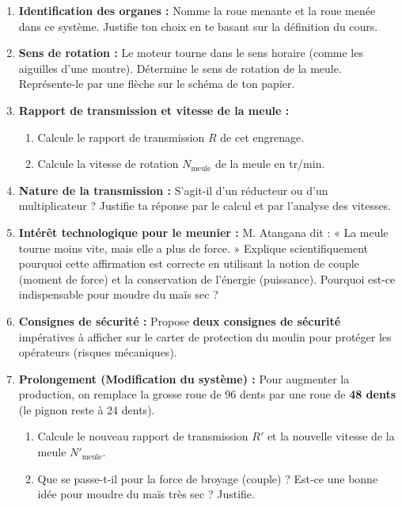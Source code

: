 \documentclass[11pt]{article}
\newcommand{\cle}[1]{{\popxbold\color{popdark}#1}}
\begin{document}
\begin{enumerate}
    \item \textbf{Identification des organes :} Nomme la \cle{roue menante} et la \cle{roue menée} dans ce système. Justifie ton choix en te basant sur la définition du cours.
    \item \textbf{Sens de rotation :} Le moteur tourne dans le sens horaire (comme les aiguilles d'une montre). Détermine le sens de rotation de la meule. Représente-le par une flèche sur le schéma de ton papier.
    \item \textbf{Rapport de transmission et vitesse de la meule :}
    \begin{enumerate}
        \item Calcule le \cle{rapport de transmission} $R$ de cet engrenage.
        \item Calcule la vitesse de rotation $N_{\text{meule}}$ de la meule en tr/min.
    \end{enumerate}
    \item \textbf{Nature de la transmission :} S'agit-il d'un \cle{réducteur} ou d'un \cle{multiplicateur} ? Justifie ta réponse par le calcul et par l'analyse des vitesses.
    \item \textbf{Intérêt technologique pour le meunier :} M. Atangana dit : « La meule tourne moins vite, mais elle a plus de force. » Explique scientifiquement pourquoi cette affirmation est correcte en utilisant la notion de \cle{couple} (moment de force) et la conservation de l'énergie (puissance). Pourquoi est-ce indispensable pour moudre du maïs sec ?
    \item \textbf{Consignes de sécurité :} Propose \textbf{deux consignes de sécurité} impératives à afficher sur le carter de protection du moulin pour protéger les opérateurs (risques mécaniques).
    \item \textbf{Prolongement (Modification du système) :} Pour augmenter la production, on remplace la grosse roue de 96 dents par une roue de \textbf{48 dents} (le pignon reste à 24 dents).
    \begin{enumerate}
        \item Calcule le nouveau rapport de transmission $R'$ et la nouvelle vitesse de la meule $N'_{\text{meule}}$.
        \item Que se passe-t-il pour la force de broyage (couple) ? Est-ce une bonne idée pour moudre du maïs très sec ? Justifie.
    \end{enumerate}
\end{enumerate}
\end{document}
